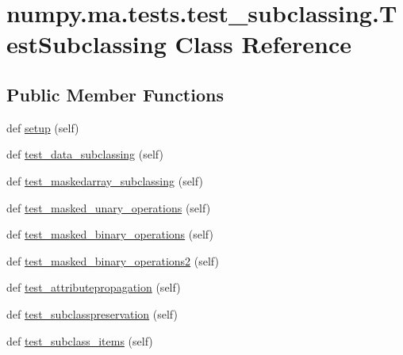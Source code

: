 \hypertarget{classnumpy_1_1ma_1_1tests_1_1test__subclassing_1_1TestSubclassing}{}\section{numpy.\+ma.\+tests.\+test\+\_\+subclassing.\+Test\+Subclassing Class Reference}
\label{classnumpy_1_1ma_1_1tests_1_1test__subclassing_1_1TestSubclassing}
\subsection*{Public Member Functions}
\begin{DoxyCompactItemize}
\item 
def \hyperlink{classnumpy_1_1ma_1_1tests_1_1test__subclassing_1_1TestSubclassing_a548272c10838f40c8813fea31368477a}{setup} (self)
\item 
def \hyperlink{classnumpy_1_1ma_1_1tests_1_1test__subclassing_1_1TestSubclassing_ad57bcc026134eebbde22ff6b66811cd6}{test\+\_\+data\+\_\+subclassing} (self)
\item 
def \hyperlink{classnumpy_1_1ma_1_1tests_1_1test__subclassing_1_1TestSubclassing_a1aa42c0f35ec63ea56b37b257f526abb}{test\+\_\+maskedarray\+\_\+subclassing} (self)
\item 
def \hyperlink{classnumpy_1_1ma_1_1tests_1_1test__subclassing_1_1TestSubclassing_a30defaf9f45f5241ab71608d7daed11f}{test\+\_\+masked\+\_\+unary\+\_\+operations} (self)
\item 
def \hyperlink{classnumpy_1_1ma_1_1tests_1_1test__subclassing_1_1TestSubclassing_a6a47cfbaad42d311ad2dbf9712efab5f}{test\+\_\+masked\+\_\+binary\+\_\+operations} (self)
\item 
def \hyperlink{classnumpy_1_1ma_1_1tests_1_1test__subclassing_1_1TestSubclassing_a6f54ab1cf4de46cd3c9a35586ae13bb3}{test\+\_\+masked\+\_\+binary\+\_\+operations2} (self)
\item 
def \hyperlink{classnumpy_1_1ma_1_1tests_1_1test__subclassing_1_1TestSubclassing_a8180a852d382a52d27dd275c8ca0b4d6}{test\+\_\+attributepropagation} (self)
\item 
def \hyperlink{classnumpy_1_1ma_1_1tests_1_1test__subclassing_1_1TestSubclassing_ad1d2c597eead5915542c6d29c80cbbd2}{test\+\_\+subclasspreservation} (self)
\item 
def \hyperlink{classnumpy_1_1ma_1_1tests_1_1test__subclassing_1_1TestSubclassing_a5d6543065043741b242ae9cc93843abc}{test\+\_\+subclass\+\_\+items} (self)

\end{DoxyCompactItemize}
